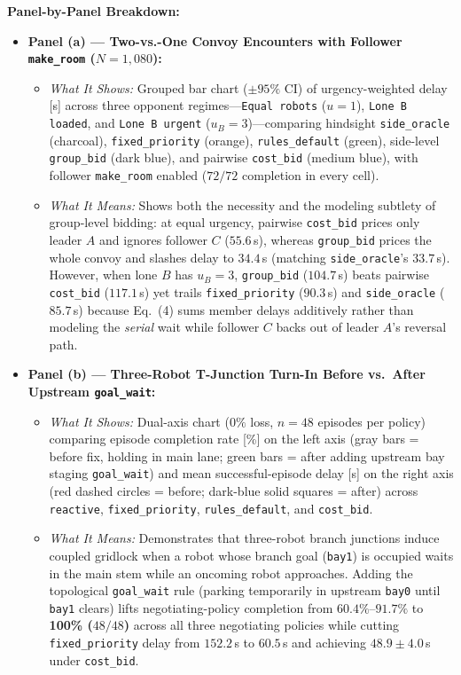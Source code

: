 \documentclass[10pt,a4paper]{article}
\begin{document}
\textbf{Panel-by-Panel Breakdown:}
\begin{itemize}
  \item \textbf{Panel (a) --- Two-vs.-One Convoy Encounters with Follower \texttt{make\_room} ($N=1{,}080$):}
  \begin{itemize}
    \item \emph{What It Shows:} Grouped bar chart ($\pm 95\%$ CI) of urgency-weighted delay [s] across three opponent regimes---\texttt{Equal robots} ($u=1$), \texttt{Lone B loaded}, and \texttt{Lone B urgent} ($u_B=3$)---comparing hindsight \texttt{side\_oracle} (charcoal), \texttt{fixed\_priority} (orange), \texttt{rules\_default} (green), side-level \texttt{group\_bid} (dark blue), and pairwise \texttt{cost\_bid} (medium blue), with follower \texttt{make\_room} enabled ($72/72$ completion in every cell).
    \item \emph{What It Means:} Shows both the necessity and the modeling subtlety of group-level bidding: at equal urgency, pairwise \texttt{cost\_bid} prices only leader $A$ and ignores follower $C$ ($55.6$\,s), whereas \texttt{group\_bid} prices the whole convoy and slashes delay to $34.4$\,s (matching \texttt{side\_oracle}'s $33.7$\,s). However, when lone $B$ has $u_B=3$, \texttt{group\_bid} ($104.7$\,s) beats pairwise \texttt{cost\_bid} ($117.1$\,s) yet trails \texttt{fixed\_priority} ($90.3$\,s) and \texttt{side\_oracle} ($85.7$\,s) because Eq.~(4) sums member delays additively rather than modeling the \emph{serial} wait while follower $C$ backs out of leader $A$'s reversal path.
  \end{itemize}
  \item \textbf{Panel (b) --- Three-Robot T-Junction Turn-In Before vs.\ After Upstream \texttt{goal\_wait}:}
  \begin{itemize}
    \item \emph{What It Shows:} Dual-axis chart ($0\%$ loss, $n=48$ episodes per policy) comparing episode completion rate [\%] on the left axis (gray bars = before fix, holding in main lane; green bars = after adding upstream bay staging \texttt{goal\_wait}) and mean successful-episode delay [s] on the right axis (red dashed circles = before; dark-blue solid squares = after) across \texttt{reactive}, \texttt{fixed\_priority}, \texttt{rules\_default}, and \texttt{cost\_bid}.
    \item \emph{What It Means:} Demonstrates that three-robot branch junctions induce coupled gridlock when a robot whose branch goal (\texttt{bay1}) is occupied waits in the main stem while an oncoming robot approaches. Adding the topological \texttt{goal\_wait} rule (parking temporarily in upstream \texttt{bay0} until \texttt{bay1} clears) lifts negotiating-policy completion from $60.4\%\text{--}91.7\%$ to \textbf{100\% ($48/48$)} across all three negotiating policies while cutting \texttt{fixed\_priority} delay from $152.2$\,s to $60.5$\,s and achieving $48.9\pm 4.0$\,s under \texttt{cost\_bid}.
  \end{itemize}
\end{itemize}
\end{document}

